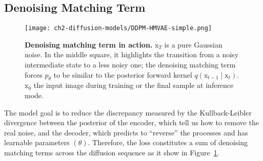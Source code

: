 \subsection{Denoising Matching Term}
\begin{figure}[t]
  \centering
  \texttt{[image: ch2-diffusion-models/DDPM-HMVAE-simple.png]}
  \captionsetup{width=\textwidth} %
  \caption{\textbf{Denoising matching term in action.} $\mathrm{x}_{T}$ is a pure Gaussian noise. In the middle square, it highlights the transition from a noisy intermediate state to a less noisy one; the denoising matching term forces $p_{\theta}$ to be similar to the posterior forward kernel $q(\mathrm{x}_{t-1}\mid \mathrm{x}_{t})$. $\mathrm{x}_{0}$ the input image during training or the final sample at inference mode. }
  \label{fig:ddpm-denoising-term}
\end{figure}
The model goal is to reduce the discrepancy measured by the Kullback-Leibler divergence between the posterior of the encoder, which tell us how to remove the real noise, and the decoder, which predicts to ``reverse'' the processes and has learnable parameters $(\theta)$. Therefore, the loss constitutes a sum of denoising matching terms across the diffusion sequence as it show in Figure~\ref{fig:ddpm-denoising-term}. \\

